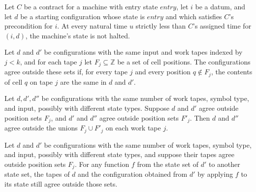 \begin{theorem}
\label{Turing.Contract.live}
\leanok
{}
Let $C$ be a contract for a machine with entry state $entry$, let $i$ be a datum, and
let $d$ be a starting configuration whose state is $entry$ and which satisfies $C$'s
precondition for $i$. At every natural time $u$ strictly less than $C$'s assigned time
for $(i,d)$, the machine's state is not halted.
\end{theorem}

\begin{definition}
\label{Turing.Cfg.SameOutside}
\leanok
{}
Let $d$ and $d'$ be configurations with the same input and work tapes indexed by $j<k$,
and for each tape $j$ let $F_j\subseteq\mathbb Z$ be a set of cell positions. The
configurations agree outside these sets if, for every tape $j$ and every position
$q\notin F_j$, the contents of cell $q$ on tape $j$ are the same in $d$ and $d'$.
\end{definition}

\begin{theorem}
\label{Turing.Cfg.SameOutside.trans}
\leanok
{}
Let $d,d',d''$ be configurations with the same number of work tapes, symbol type, and
input, possibly with different state types. Suppose $d$ and $d'$ agree outside position
sets $F_j$, and $d'$ and $d''$ agree outside position sets $F'_j$. Then $d$ and $d''$
agree outside the unions $F_j\cup F'_j$ on each work tape $j$.
\end{theorem}

\begin{theorem}
\label{Turing.Cfg.SameOutside.mapState}
\leanok
{}
Let $d$ and $d'$ be configurations with the same number of work tapes, symbol type, and
input, possibly with different state types, and suppose their tapes agree outside
position sets $F_j$. For any function $f$ from the state set of $d'$ to another state
set, the tapes of $d$ and the configuration obtained from $d'$ by applying $f$ to its
state still agree outside those sets.
\end{theorem}

